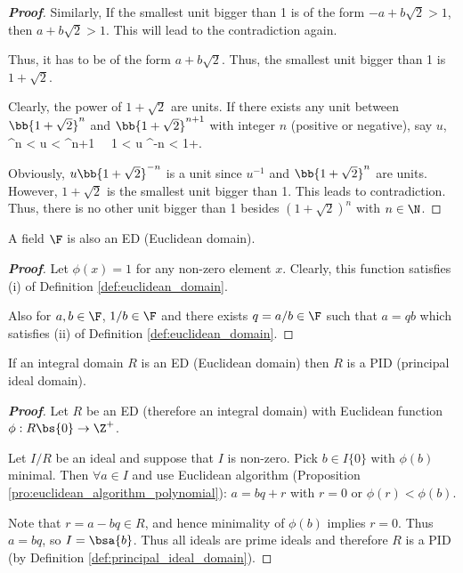\begin{proof}[\bf Proof]
Similarly, If the smallest unit bigger than 1 is of the form $-a+b\sqrt{2} > 1$, then $a+b\sqrt{2} > 1$. This will lead to the contradiction again.

Thus, it has to be of the form  $a+b\sqrt{2}$. Thus, the smallest unit bigger than 1 is $1+\sqrt{2}$.

Clearly, the power of $1+\sqrt{2}$ are units. If there exists any unit between $\bb{1+\sqrt{2}}^n$ and $\bb{1+\sqrt{2}}^{n+1}$ with integer $n$ (positive or negative), say $u$,
\be
{}^n < u < ^{n+1} \ \ra \ 1 < u ^{-n} < 1+.
\ee

Obviously, $u \bb{1+\sqrt{2}}^{-n}$ is a unit since $u^{-1}$ and $\bb{1+\sqrt{2}}^{n}$ are units. However, $1+\sqrt{2}$ is the smallest unit bigger than 1. This leads to contradiction. Thus, there is no other unit bigger than 1 besides $(1+\sqrt{2})^n$ with $n\in \N$.
\end{proof}


\begin{proposition}\label{pro:field_implies_ed}
A field $\F$ is also an ED (Euclidean domain).
\end{proposition}

\begin{proof}[\bf Proof]
Let $\phi(x) = 1$ for any non-zero element $x$. Clearly, this function satisfies (i) of Definition \ref{def:euclidean_domain}.

Also for $a,b\in \F$, $1/b\in \F$ and there exists $q = a/b \in \F$ such that $a = qb$ which satisfies (ii) of Definition \ref{def:euclidean_domain}.
\end{proof}

\begin{proposition}\label{pro:ed_implies_pid}
If an integral domain $R$ is an ED (Euclidean domain) then $R$ is a PID (principal ideal domain).
\end{proposition}

\begin{proof}[\bf Proof]%
Let $R$ be an ED (therefore an integral domain) with Euclidean function $\phi: R \bs \{0\} \to \Z^+$. %

Let $I /R$ be an ideal and suppose that $I$ is non-zero. Pick $b \in I \{0\}$ with $\phi(b)$ minimal. Then $\forall a \in I$ and use Euclidean algorithm (Proposition \ref{pro:euclidean_algorithm_polynomial}): $a = bq + r$ with $r = 0$ or $\phi(r) < \phi(b)$.

Note that $r = a - bq \in R$, and hence minimality of $\phi(b)$ implies $r = 0$. Thus $a = bq$, so $I = \bsa{b}$. Thus all ideals are prime ideals and therefore $R$ is a PID (by Definition \ref{def:principal_ideal_domain}).
\end{proof}



